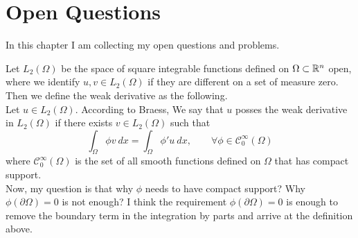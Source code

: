 \chapter{Open Questions}

In this chapter I am collecting my open questions and problems.

\begin{Question}
  Let $ L_2(\Omega) $ be the space of square integrable functions defined on $ \Omega \subset \mathbb{R}^n $ open, where we identify $ u,v \in L_2(\Omega) $ if they are different on a set of measure zero. Then we define the weak derivative as the following.\\
  Let $ u \in L_2(\Omega) $. According to Braess, We say that $ u $ posses the weak derivative in $ L_2(\Omega) $ if  there exists $ v \in L_2(\Omega) $ such that 
  \[ \int_\Omega \phi v\ dx = \int_\Omega \phi' u\ dx, \qquad \forall \phi \in \mathscr{C}^{\infty}_{0}(\Omega)  \] 
  where $ \mathscr{C}^{\infty}_0(\Omega) $ is the set of all smooth functions defined on $ \Omega $ that has compact support.\\

  Now, my question is that why $ \phi $ needs to have compact support? Why $ \phi(\partial \Omega) =0 $ is not enough? I think the requirement $ \phi(\partial \Omega) = 0 $ is enough to remove the boundary term in the integration by parts and arrive at the definition above.
  
\end{Question}

